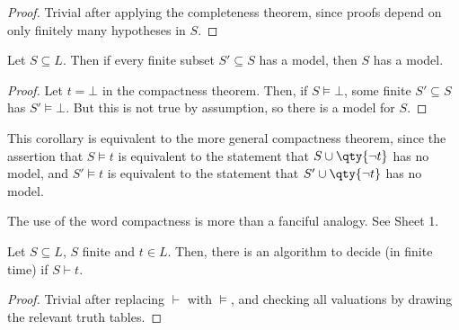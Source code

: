 \begin{proof}
    Trivial after applying the completeness theorem, since proofs depend on only finitely many hypotheses in $S$.
\end{proof}

\begin{corollary}
    Let $S \subseteq L$.
    Then if every finite subset $S' \subseteq S$ has a model, then $S$ has a model.
\end{corollary}

\begin{proof}
    Let $t = \bot$ in the compactness theorem.
    Then, if $S \models \bot$, some finite $S' \subseteq S$ has $S' \models \bot$.
    But this is not true by assumption, so there is a model for $S$.
\end{proof}

\begin{remark}
    This corollary is equivalent to the more general compactness theorem, since the assertion that $S \models t$ is equivalent to the statement that $S \cup \qty{\neg t}$ has no model, and $S' \models t$ is equivalent to the statement that $S' \cup \qty{\neg t}$ has no model.
\end{remark}

\begin{note}
    The use of the word compactness is more than a fanciful analogy.
    See Sheet 1.
\end{note}

\begin{theorem}
    Let $S \subseteq L$, $S$ finite and $t \in L$.
    Then, there is an algorithm to decide (in finite time) if $S \vdash t$.
\end{theorem}

\begin{proof}
    Trivial after replacing $\vdash$ with $\models$, and checking all valuations by drawing the relevant truth tables.
\end{proof}
